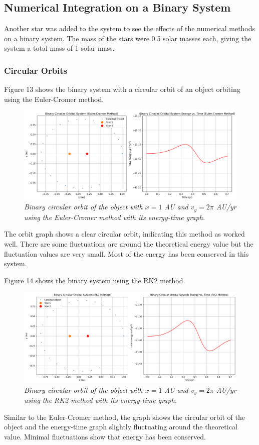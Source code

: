 \documentclass[11 pt, a4paper]{article}
\begin{document}
\subsection{Numerical Integration on a Binary System}
Another star was added to the system to see the effects of the numerical methods on a binary system. The mass of the stars were 0.5 solar masses each, giving the system a total mass of 1 solar mass.

\subsubsection{Circular Orbits}
Figure 13 shows the binary system with a circular orbit of an object orbiting using the Euler-Cromer method.
\begin{figure}[H]
  \includegraphics[width=1\linewidth]{binaryeulercircular.png}
  \centering
  \caption{\textit{Binary circular orbit of the object with $x = 1$ AU and $v_y = 2\pi$ AU/yr using the Euler-Cromer method with its energy-time graph.}} 
\end{figure}
The orbit graph shows a clear circular orbit, indicating this method as worked well. There are some fluctuations are around the theoretical energy value but the fluctuation values are very small. Most of the energy has been conserved in this system.

Figure 14 shows the binary system using the RK2 method.
\begin{figure}[H]
  \includegraphics[width=1\linewidth]{binaryrk2circular.png}
  \centering
  \caption{\textit{Binary circular orbit of the object with $x = 1$ AU and $v_y = 2\pi$ AU/yr using the RK2 method with its energy-time graph.}} 
\end{figure}
Similar to the Euler-Cromer method, the graph shows the circular orbit of the object and the energy-time graph slightly fluctuating around the theoretical value. Minimal fluctuations show that energy has been conserved.
\end{document}
